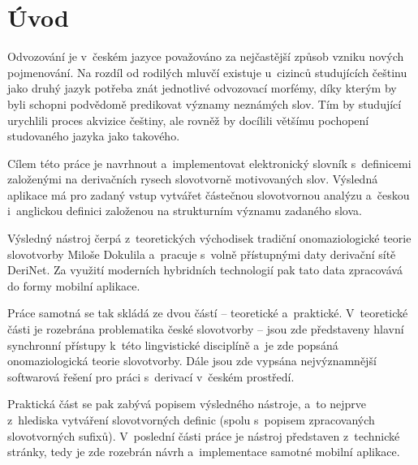 \hypertarget{uxfavod}{%
\chapter*{Úvod}\label{uvod}
}

Odvozování je v~českém jazyce považováno za nejčastější způsob vzniku
nových pojmenování. Na rozdíl od rodilých mluvčí existuje u~cizinců
studujících češtinu jako druhý jazyk potřeba znát jednotlivé odvozovací
morfémy, díky kterým by byli schopni podvědomě predikovat významy
neznámých slov. Tím by studující urychlili proces akvizice češtiny, ale
rovněž by docílili většímu pochopení studovaného jazyka jako takového.

Cílem této práce je navrhnout a~implementovat elektronický slovník
s~definicemi založenými na derivačních rysech slovotvorně motivovaných
slov. Výsledná aplikace má pro zadaný vstup vytvářet částečnou
slovotvornou analýzu a~českou i~anglickou definici založenou na
strukturním významu zadaného slova.

Výsledný nástroj čerpá z~teoretických východisek tradiční
onomaziologické teorie slovotvorby Miloše Dokulila a~pracuje s~volně
přístupnými daty derivační sítě DeriNet. Za využití moderních hybridních
technologií pak tato data zpracovává do formy mobilní aplikace.

Práce samotná se tak skládá ze dvou částí -- teoretické a~praktické.
V~teoretické části je rozebrána problematika české slovotvorby -- jsou zde
představeny hlavní synchronní přístupy k~této lingvistické disciplíně
a~je zde popsáná onomaziologická teorie slovotvorby. Dále jsou zde vypsána
nejvýznamnější softwarová řešení pro práci s~derivací v~českém
prostředí.

Praktická část se pak zabývá popisem výsledného nástroje, a~to nejprve
z~hlediska vytváření slovotvorných definic (spolu s~popisem zpracovaných
slovotvorných sufixů). V~poslední části práce je nástroj představen
z~technické stránky, tedy je zde rozebrán návrh a~implementace samotné
mobilní aplikace.
